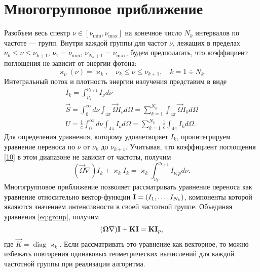 \section {Многогрупповое приближение}
Разобъем весь спектр $\nu \in [\nu_{\min}, \nu_{\max}]$ на конечное число $N_k$ интервалов по частоте --- групп. Внутри каждой группы для частот $\nu$, лежащих в пределах $\nu_{k} \leqslant \nu \leqslant \nu_{k+1}$, $\nu_1 = \nu_{\min}$, $\nu_{N_k+1} = \nu_{\max}$, будем предполагать, что коэффициент поглощения не зависит от энергии фотона:
\begin {equation}
\varkappa_\nu (\nu) = \varkappa_k, \quad \nu_{k} \leqslant \nu \leqslant \nu_{k+1}, \quad k = 1 \div N_k.
\label{10}
\end {equation}
Интегральный поток и плотность энергии излучения представим в виде
\begin {gather}
I_k = \int_{\nu_k}^{\nu_{k+1}} I_\nu d \nu\\
\vec S = \int_0^\infty d\nu \int_{4\pi} \vec\Omega I_\nu d\Omega = \sum_{k=1}^{N_k} \int_{4\pi} \vec\Omega I_k d\Omega\\
U = \frac{1}{c} \int_0^\infty d\nu \int_{4\pi} I_\nu d \Omega = \sum_{k=1}^{N_k} \frac{1}{c} \int_{4\pi} I_k d \Omega.
\end {gather}
Для определения уравнения, которому удовлетворяет $I_k$, проинтегрируем уравнение переноса по $\nu$ от $\nu_k$ до $\nu_{k+1}$. Учитывая, что коэффициент поглощения \eqref{10} в этом диапазоне не зависит от частоты, получим
\begin {equation}
(\vec\Omega \nabla )I_k + \varkappa_k I_k = \varkappa_k \int_{\nu_k}^{\nu_{k+1}} I_{\nu, p} d \nu.
\label{eq:group}
\end {equation}
Многогрупповое приближение позволяет рассматривать уравнение переноса как уравнение относительно вектор-функции $\avec I = (I_1, \dots, I_{N_k})$, компоненты которой являются значением интенсивности в своей частотной группе. 
Объединяя уравнения \eqref{eq:group}, получим
\begin {equation}
(\vec\Omega \nabla ) \avec I + \vec K \avec I = \vec K \avec I_{p},
\end {equation} 
где $\vec K = \operatorname{diag} \varkappa_k$. Если рассматривать это уравнение как векторное, то можно избежать повторения одинаковых геометрических вычислений для каждой частотной группы при реализации алгоритма.
